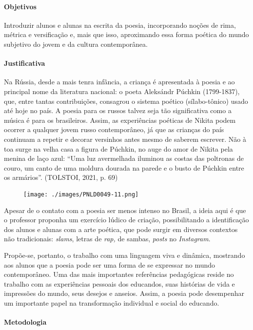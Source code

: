 \documentclass{article}
\begin{document}
\paragraph{Objetivos}
Introduzir alunos e alunas na escrita da poesia, incorporando noções de
rima, métrica e versificação e, mais que isso, aproximando essa forma
poética do mundo subjetivo do jovem e da cultura contemporânea.

\paragraph{Justificativa}
Na Rússia, desde a mais tenra infância, a criança é apresentada à poesia
e ao principal nome da literatura nacional: o poeta Aleksándr Púchkin
(1799-1837), que, entre tantas contribuições, consagrou o sistema
poético (sílabo-tônico) usado até hoje no país. A poesia para os russos
talvez seja tão significativa como a música é para os brasileiros.
Assim, as experiências poéticas de Nikita podem ocorrer a qualquer jovem
russo contemporâneo, já que as crianças do país continuam a repetir e
decorar versinhos antes mesmo de saberem escrever. Não à toa surge na
velha casa a figura de Púchkin, no auge do amor de Nikita pela menina de
laço azul: ``Uma luz avermelhada iluminou as costas das poltronas de
couro, um canto de uma moldura dourada na parede e o busto de Púchkin
entre os armários''. (TOLSTOI, 2021, p. 69)


\begin{figure}[ht!]
\texttt{[image: ./images/PNLD0049-11.png]}
\end{figure}

Apesar de o contato com a poesia ser menos intenso no Brasil, a ideia
aqui é que o professor proponha um exercício lúdico de criação,
possibilitando a identificação dos alunos e alunas com a arte poética,
que pode surgir em diversos contextos não tradicionais: \emph{slams},
letras de \emph{rap,} de sambas, \emph{posts} no \emph{Instagram}.

Propõe-se, portanto, o trabalho com uma linguagem viva e dinâmica,
mostrando aos alunos que a poesia pode ser uma forma de se expressar no
mundo contemporâneo. Uma das mais importantes referências pedagógicas
reside no trabalho com as experiências pessoais dos educandos, suas
histórias de vida e impressões do mundo, seus desejos e anseios. Assim,
a poesia pode desempenhar um importante papel na transformação
individual e social do educando.

\paragraph{Metodologia}
\end{document}
